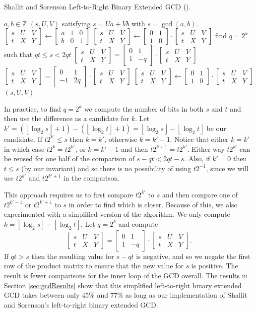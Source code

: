 \documentclass{ucalgthes1}
\theoremstyle{definition}
\newcommand{\ZZ}{\mathbb{Z}}
\newcommand{\matrixtt}[4]{\left[ \begin{array}{rr} #1 & #2 \\ #3 & #4 \end{array} \right]}
\newcommand{\matrixThreeTwo}[6]{\left[ \begin{array}{rrr} #1 & #2 & #3 \\ #4 & #5 & #6 \end{array} \right]}
\newcommand{\floor}[1]{\left\lfloor #1 \right\rfloor}
\begin{document}
\begin{algorithm}[htb]
\caption{Shallit and Sorenson Left-to-Right Binary Extended GCD (\cite{Shallit1994}).}
\label{alg:shallitGcd}
\begin{algorithmic}[1]
\Require $a,b \in \ZZ$
\Ensure $(s, U, V)$ satisfying $s = Ua + Vb$ with $s = \gcd(a, b)$.
\State $\matrixThreeTwo{s}{U}{V}{t}{X}{Y} \gets 
        \matrixThreeTwo{a}{1}{0}{b}{0}{1}$
	\State $\matrixThreeTwo{s}{U}{V}{t}{X}{Y} \gets
	        \matrixtt{0}{1}{1}{0} \cdot \matrixThreeTwo{s}{U}{V}{t}{X}{Y}$
\EndIf
{}
	\State find $q=2^k$ such that $qt \le s < 2qt$
		\State $\matrixThreeTwo{s}{U}{V}{t}{X}{Y} =
		\matrixtt{0}{1}{1}{-q} \cdot \matrixThreeTwo{s}{U}{V}{t}{X}{Y}$
	\Else
		\State $\matrixThreeTwo{s}{U}{V}{t}{X}{Y} =
		\matrixtt{0}{1}{-1}{2q} \cdot \matrixThreeTwo{s}{U}{V}{t}{X}{Y}$
	\EndIf
		\State $\matrixThreeTwo{s}{U}{V}{t}{X}{Y} \gets
	    	    \matrixtt{0}{1}{1}{0} \cdot \matrixThreeTwo{s}{U}{V}{t}{X}{Y}$
	\EndIf
\EndWhile
\State \Return $(s, U, V)$
\end{algorithmic}
\end{algorithm}
In practice, to find $q=2^k$ we compute the number of bits in both $s$ and $t$ and then use the difference as a candidate for $k$.  Let $k' = (\floor{\log_2s} + 1) - (\floor{\log_2t}+1) = \floor{\log_2s} - \floor{\log_2t}$ be our candidate.  If $t2^{k'} \le s$ then $k = k'$, otherwise $k = k'-1$.  Notice that either $k=k'$ in which case $t2^k=t2^{k'}$, or $k=k'-1$ and then $t2^{k+1} = t2^{k'}$.  Either way $t2^{k'}$ can be reused for one half of the comparison of $s-qt < 2qt - s$.  Also, if $k' = 0$ then $t \le s$ (by our invariant) and so there is no possibility of using $t2^{-1}$, since we will use $t2^{k'}$ and $t2^{k'+1}$ in the comparison.

This approach requires us to first compare $t2^{k'}$ to $s$ and then compare one of $t2^{k'-1}$ or $t2^{k'+1}$ to $s$ in order to find which is closer.  Because of this, we also experimented with a simplified version of the algorithm.  We only compute $k = \floor{\log_2s}-\floor{\log_2t}$.  Let $q=2^k$ and compute
\[
	\matrixThreeTwo{s}{U}{V}{t}{X}{Y} =
		\matrixtt{0}{1}{1}{-q} \cdot \matrixThreeTwo{s}{U}{V}{t}{X}{Y}.
\]
If $qt > s$ then the resulting value for $s-qt$ is negative, and so we negate the first row of the product matrix to ensure that the new value for $s$ is positive.  The result is fewer comparisons for the inner loop of the GCD overall.  The results in Section \ref{sec:gcdResults} show that this simplified left-to-right binary extended GCD takes between only 45\% and 77\% as long as our implementation of Shallit and Sorenson's left-to-right binary extended GCD.
\end{document}
